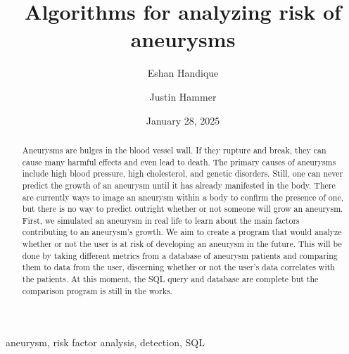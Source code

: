﻿\documentclass[12pt,conference,onecolumn]{IEEEtran}
\title{Algorithms for analyzing risk of aneurysms}
\author{Eshan Handique \and Justin Hammer}
\date{January 28, 2025}
\begin{document}
\maketitle 

\begin{abstract}
Aneurysms are bulges in the blood vessel wall. If they rupture and break, they can cause many harmful effects and even lead to death. The primary causes of aneurysms include high blood pressure, high cholesterol, and genetic disorders. Still, one can never predict the growth of an aneurysm until it has already manifested in the body. There are currently ways to image an aneurysm within a body to confirm the presence of one, but there is no way to predict outright whether or not someone will grow an aneurysm. First, we simulated an aneurysm in real life to learn about the main factors contributing to an aneurysm's growth. We aim to create a program that would analyze whether or not the user is at risk of developing an aneurysm in the future. This will be done by taking different metrics from a database of aneurysm patients and comparing them to data from the user, discerning whether or not the user’s data correlates with the patients. At this moment, the SQL query and database are complete but the comparison program is still in the works.
\end{abstract}

\begin{IEEEkeywords}
aneurysm, risk factor analysis, detection, SQL
\end{IEEEkeywords}
\end{document}

